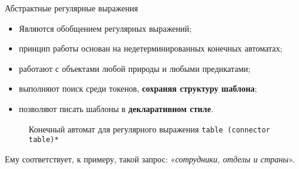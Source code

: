 \begin{frame}[fragile]{Абстрактные регулярные выражения}%
  \begin{itemize}%
    \item Являются обобщением регулярных выражений;
    \item принцип работы основан на недетерминированных конечных автоматах;
    \item работают с объектами любой природы и любыми предикатами;
    \item выполняют поиск среди токенов, \textbf{сохраняя структуру шаблона};
    \item позволяют писать шаблоны в \textbf{декларативном стиле}.
  \end{itemize}

  \begin{figure}[H]%
    \small
    \centering
    Конечный автомат для регулярного выражения \texttt{table (connector table)*}
  \end{figure}
  Ему соответствует, к примеру, такой запрос: «\textit{сотрудники, отделы и страны}».
\end{frame}
